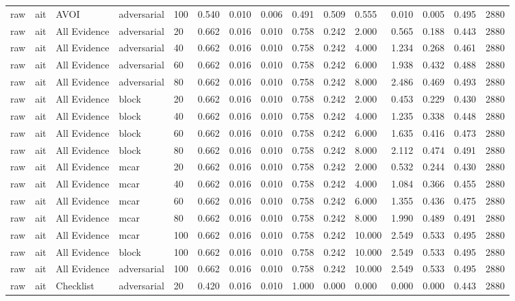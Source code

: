 \begin{table}[!ht]
{\begin{tabular}{lllllllllllllll}
raw & ait & AVOI & adversarial & 100 & 0.540 & 0.010 & 0.006 & 0.491 & 0.509 & 0.555 & 0.010 & 0.005 & 0.495 & 2880 \\
raw & ait & All Evidence & adversarial & 20 & 0.662 & 0.016 & 0.010 & 0.758 & 0.242 & 2.000 & 0.565 & 0.188 & 0.443 & 2880 \\
raw & ait & All Evidence & adversarial & 40 & 0.662 & 0.016 & 0.010 & 0.758 & 0.242 & 4.000 & 1.234 & 0.268 & 0.461 & 2880 \\
raw & ait & All Evidence & adversarial & 60 & 0.662 & 0.016 & 0.010 & 0.758 & 0.242 & 6.000 & 1.938 & 0.432 & 0.488 & 2880 \\
raw & ait & All Evidence & adversarial & 80 & 0.662 & 0.016 & 0.010 & 0.758 & 0.242 & 8.000 & 2.486 & 0.469 & 0.493 & 2880 \\
raw & ait & All Evidence & block & 20 & 0.662 & 0.016 & 0.010 & 0.758 & 0.242 & 2.000 & 0.453 & 0.229 & 0.430 & 2880 \\
raw & ait & All Evidence & block & 40 & 0.662 & 0.016 & 0.010 & 0.758 & 0.242 & 4.000 & 1.235 & 0.338 & 0.448 & 2880 \\
raw & ait & All Evidence & block & 60 & 0.662 & 0.016 & 0.010 & 0.758 & 0.242 & 6.000 & 1.635 & 0.416 & 0.473 & 2880 \\
raw & ait & All Evidence & block & 80 & 0.662 & 0.016 & 0.010 & 0.758 & 0.242 & 8.000 & 2.112 & 0.474 & 0.491 & 2880 \\
raw & ait & All Evidence & mcar & 20 & 0.662 & 0.016 & 0.010 & 0.758 & 0.242 & 2.000 & 0.532 & 0.244 & 0.430 & 2880 \\
raw & ait & All Evidence & mcar & 40 & 0.662 & 0.016 & 0.010 & 0.758 & 0.242 & 4.000 & 1.084 & 0.366 & 0.455 & 2880 \\
raw & ait & All Evidence & mcar & 60 & 0.662 & 0.016 & 0.010 & 0.758 & 0.242 & 6.000 & 1.355 & 0.436 & 0.475 & 2880 \\
raw & ait & All Evidence & mcar & 80 & 0.662 & 0.016 & 0.010 & 0.758 & 0.242 & 8.000 & 1.990 & 0.489 & 0.491 & 2880 \\
raw & ait & All Evidence & mcar & 100 & 0.662 & 0.016 & 0.010 & 0.758 & 0.242 & 10.000 & 2.549 & 0.533 & 0.495 & 2880 \\
raw & ait & All Evidence & block & 100 & 0.662 & 0.016 & 0.010 & 0.758 & 0.242 & 10.000 & 2.549 & 0.533 & 0.495 & 2880 \\
raw & ait & All Evidence & adversarial & 100 & 0.662 & 0.016 & 0.010 & 0.758 & 0.242 & 10.000 & 2.549 & 0.533 & 0.495 & 2880 \\
raw & ait & Checklist & adversarial & 20 & 0.420 & 0.016 & 0.010 & 1.000 & 0.000 & 0.000 & 0.000 & 0.000 & 0.443 & 2880 \\

\end{tabular}}
\end{table}
